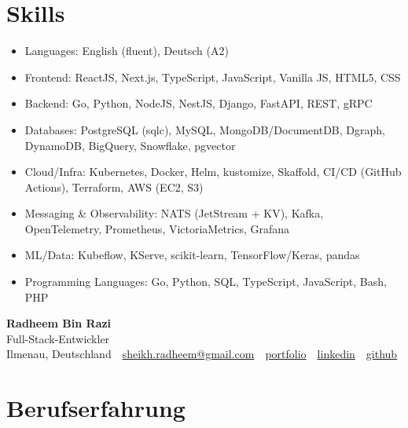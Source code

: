 \documentclass[10pt,a4paper]{resume}
\makeatletter
\newcommand{\Portfolio}{https://radheem.github.io/my-cv}
\newcommand{\PortfolioText}{portfolio}
\newcommand{\GitHub}{https://github.com/radheem}
\newcommand{\LinkedIn}{https://www.linkedin.com/in/radheem-razi}
\newcommand{\Email}{sheikh.radheem@gmail.com}
\makeatother
\begin{document}
\section{Skills}

\begin{itemize}[leftmargin=1.4em,nosep,topsep=2pt]
  \item Languages: English (fluent), Deutsch (A2)
  \item Frontend: ReactJS, Next.js, TypeScript, JavaScript, Vanilla JS, HTML5, CSS
  \item Backend: Go, Python, NodeJS, NestJS, Django, FastAPI, REST, gRPC
  \item Databases: PostgreSQL (sqlc), MySQL, MongoDB/DocumentDB, Dgraph, DynamoDB, BigQuery, Snowflake, pgvector
  \item Cloud/Infra: Kubernetes, Docker, Helm, kustomize, Skaffold, CI/CD (GitHub Actions), Terraform, AWS (EC2, S3)
  \item Messaging \& Observability: NATS (JetStream + KV), Kafka, OpenTelemetry, Prometheus, VictoriaMetrics, Grafana
  \item ML/Data: Kubeflow, KServe, scikit-learn, TensorFlow/Keras, pandas
  \item Programming Languages: Go, Python, SQL, TypeScript, JavaScript, Bash, PHP
\end{itemize}

\clearpage
{}

\begin{center}
  {\huge\bfseries Radheem Bin Razi}\\[3pt]
  {\large Full-Stack-Entwickler}\\[6pt]
  \small
  Ilmenau, Deutschland \,\textbar\,
  \href{mailto:\Email}{\Email} \,\textbar\,
  \href{\Portfolio}{\PortfolioText} \,\textbar\,
  \href{\LinkedIn}{linkedin} \,\textbar\,
  \href{\GitHub}{github}
\end{center}
\vspace{2pt}

\section{Berufserfahrung}
\end{document}
